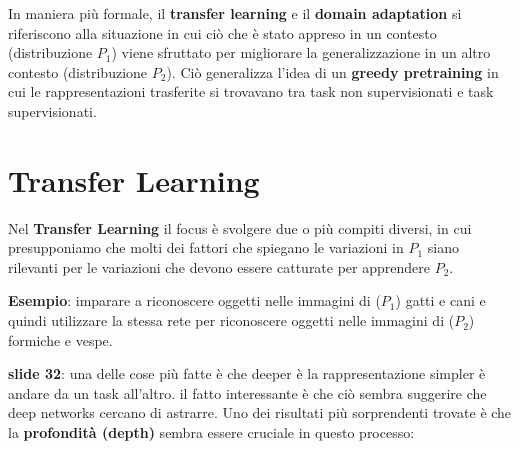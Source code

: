 In maniera più formale, il \textbf{transfer learning} e il \textbf{domain adaptation} si riferiscono alla 
situazione in cui ciò che è stato appreso in un contesto (distribuzione $P_1$) viene sfruttato per migliorare 
la generalizzazione in un altro contesto (distribuzione $P_2$).
Ciò generalizza l'idea di un \textbf{greedy pretraining} in cui le rappresentazioni trasferite si trovavano 
tra task non supervisionati e task supervisionati.
\newline
\newline
\section{Transfer Learning}
Nel \textbf{Transfer Learning} il focus è svolgere due o più compiti diversi, in cui presupponiamo che molti 
dei fattori che spiegano le variazioni in $P_1$ siano rilevanti per le variazioni che devono essere catturate
per apprendere $P_2$. 


\textbf{Esempio}: imparare a riconoscere oggetti nelle immagini di ($P_1$) gatti e cani e quindi utilizzare 
la stessa rete per riconoscere oggetti nelle immagini di ($P_2$) formiche e vespe.

\textbf{slide 32}: una delle cose più fatte è che deeper è la rappresentazione simpler è andare da un
task all'altro. il fatto interessante è che ciò sembra suggerire che deep networks cercano di astrarre.
\newline
\newline
Uno dei risultati più sorprendenti trovate è che la \textbf{profondità (depth)} sembra essere cruciale in
questo processo:


